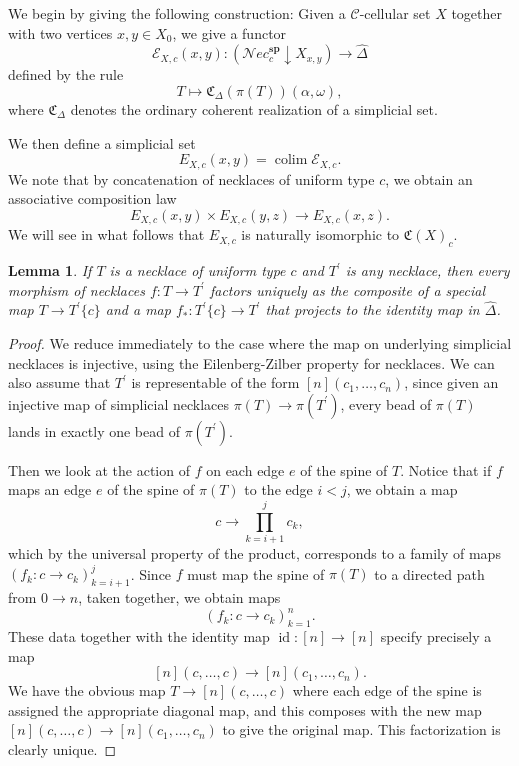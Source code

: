 \documentclass{amsart}
\numberwithin{equation}{section}
\theoremstyle{plain}   %
\newtheorem{lemma}[subsection]{Lemma}
\theoremstyle{remark}
\theoremstyle{plain}
\DeclareMathOperator{\id}{id}
\DeclareMathOperator{\colim}{colim}
\newcommand{\Nec}{\ensuremath{{\mathcal{N}ec}}}
\newcommand{\overcat}[2]{{\left(#1\downarrow #2\right)}}
\newcommand{\psh}[1]{\ensuremath{\widehat{#1}}}
\newcommand{\C}{\ensuremath{\mathcal{C}}}
\begin{document}
We begin by giving the following construction: Given a \(\C\)-cellular set \(X\) together with two vertices \(x,y\in X_0\), we give a functor \[\mathcal{E}_{X,c}(x,y):\overcat{\Nec^\mathbf{sp}_c}{X_{x,y}}\to \psh{\Delta}\] defined by the rule \[T\mapsto \mathfrak{C}_\Delta(\pi(T))(\alpha,\omega),\] where \(\mathfrak{C}_\Delta\) denotes the ordinary coherent realization of a simplicial set.

We then define a simplicial set \[E_{X,c}(x,y)=\colim \mathcal{E}_{X,c}.\] We note that by concatenation of necklaces of uniform type \(c\), we obtain an associative composition law \[E_{X,c}(x,y)\times E_{X,c}(y,z)\to E_{X,c}(x,z).\]  We will see in what follows that \(E_{X,c}\) is naturally isomorphic to \(\mathfrak{C}(X)_c\).

\begin{lemma}\label{replemma} If \(T\) is a necklace of uniform type \(c\) and \(T^\prime\) is any necklace, then every morphism of necklaces \(f:T\to T^\prime\) factors uniquely as the composite of a special map \(T\to T^\prime\{c\}\) and a map \(f_*:T^\prime\{c\}\to T^\prime\) that projects to the identity map in \(\psh{\Delta}\).
\end{lemma}
\begin{proof} We reduce immediately to the case where the map on underlying simplicial necklaces is injective, using the Eilenberg-Zilber property for necklaces.  We can also assume that \(T^\prime\) is representable of the form \([n](c_1,\dots,c_n)\), since given an injective map of simplicial necklaces \(\pi(T)\to \pi(T^\prime)\), every bead of \(\pi(T)\) lands in exactly one bead of \(\pi(T^\prime).\)

	Then we look at the action of \(f\) on each edge \(e\) of the spine of \(T\). Notice that if \(f\) maps an edge \(e\) of the spine of \(\pi(T)\) to the edge \(i<j\), we obtain a map \[c\to \prod_{k=i+1}^j c_k,\] which by the universal property of the product, corresponds to a family of maps \((f_k:c\to c_k)_{k=i+1}^j\).  Since \(f\) must map the spine of \(\pi(T)\) to a directed path from \(0\to n\), taken together, we obtain maps \[(f_k:c\to c_k)_{k=1}^n.\] These data together with the identity map \(\id:[n]\to [n]\) specify precisely a map \[[n](c,\dots,c)\to [n](c_1,\dots,c_n).\]  We have the obvious map \(T\to [n](c,\dots,c)\) where each edge of the spine is assigned the appropriate diagonal map, and this composes with the new map \([n](c,\dots,c)\to [n](c_1,\dots,c_n)\) to give the original map. This factorization is clearly unique.
\end{proof}
\end{document}
